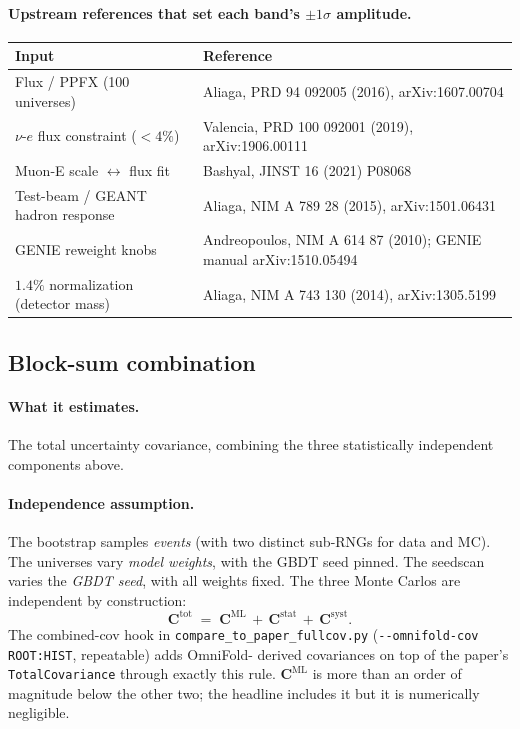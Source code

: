 \documentclass[12pt]{article}
\newcommand{\stat}{\text{stat}}
\newcommand{\syst}{\text{syst}}
\newcommand{\ML}{\text{ML}}
\newcommand{\tot}{\text{tot}}
\begin{document}
\paragraph{Upstream references that set each band's $\pm1\sigma$ amplitude.}
\begin{center}
\begin{tabular}{@{}ll@{}}
\toprule
Input & Reference \\
\midrule
Flux / PPFX (100 universes) & Aliaga, PRD 94 092005 (2016), arXiv:1607.00704 \\
$\nu$-$e$ flux constraint ($<4\%$) & Valencia, PRD 100 092001 (2019), arXiv:1906.00111 \\
Muon-E scale $\leftrightarrow$ flux fit & Bashyal, JINST 16 (2021) P08068 \\
Test-beam / GEANT hadron response & Aliaga, NIM A 789 28 (2015), arXiv:1501.06431 \\
GENIE reweight knobs & Andreopoulos, NIM A 614 87 (2010); GENIE manual arXiv:1510.05494 \\
$1.4\%$ normalization (detector mass) & Aliaga, NIM A 743 130 (2014), arXiv:1305.5199 \\
\bottomrule
\end{tabular}
\end{center}

\subsection{Block-sum combination}
\label{sec:combine}

\paragraph{What it estimates.}
The total uncertainty covariance, combining the three statistically
independent components above.

\paragraph{Independence assumption.}
The bootstrap samples \emph{events} (with two distinct sub-RNGs for
data and MC). The universes vary \emph{model weights}, with the GBDT
seed pinned. The seedscan varies the \emph{GBDT seed}, with all
weights fixed. The three Monte Carlos are independent by
construction:
\begin{equation}
\mathbf{C}^{\tot}
\;=\;
\mathbf{C}^{\ML} \,+\, \mathbf{C}^{\stat} \,+\, \mathbf{C}^{\syst}.
\label{eq:blocksum}
\end{equation}
The combined-cov hook in \texttt{compare\_to\_paper\_fullcov.py}
(\texttt{-{}-omnifold-cov ROOT:HIST}, repeatable) adds OmniFold-
derived covariances on top of the paper's \texttt{TotalCovariance}
through exactly this rule. $\mathbf{C}^{\ML}$ is more than an order of
magnitude below the other two; the headline includes it but it is
numerically negligible.
\end{document}
